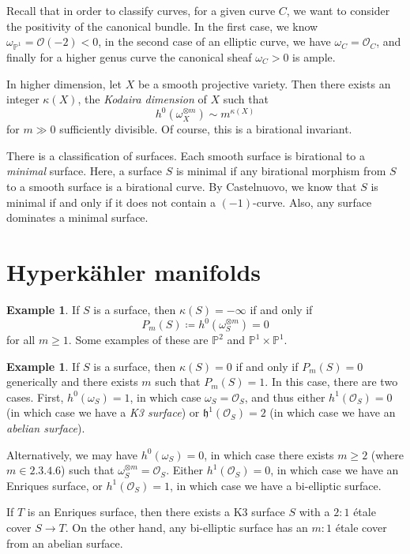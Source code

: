 \documentclass[leqno, openany]{memoir}
\theoremstyle{definition}
\newtheorem{exm}[thm]{Example}
\theoremstyle{remark}
\theoremstyle{plain}
\theoremstyle{definition}
\theoremstyle{remark}
\renewcommand{\P}{\mathbb{P}}
\newcommand{\h}{\mathfrak{h}}
\newcommand{\mc}[1]{\mathcal{#1}}
\begin{document}
Recall that in order to classify curves, for a given curve $C$, we want to consider the positivity of the canonical bundle. In the first case, we know $\omega_{\P^1} = \mc{O}(-2) < 0$, in the second case of an elliptic curve, we have $\omega_C = \mc{O}_C$, and finally for a higher genus curve the canonical sheaf $\omega_C > 0$ is ample.

In higher dimension, let $X$ be a smooth projective variety. Then there exists an integer $\kappa(X)$, the \textit{Kodaira dimension} of $X$ such that
\[ h^0(\omega_X^{\otimes m}) \sim m^{\kappa(X)} \]
for $m \gg 0$ sufficiently divisible. Of course, this is a birational invariant.

There is a classification of surfaces. Each smooth surface is birational to a \textit{minimal} surface. Here, a surface $S$ is minimal if any birational morphism from $S$ to a smooth surface is a birational curve. By Castelnuovo, we know that $S$ is minimal if and only if it does not contain a $(-1)$-curve. Also, any surface dominates a minimal surface.

\section{Hyperk\"ahler manifolds}%
\label{sec:hyperkahler_manifolds}

\begin{exm}
    If $S$ is a surface, then $\kappa(S) = -\infty$ if and only if 
    \[ P_m(S) \coloneqq h^0(\omega_S^{\otimes m}) = 0 \] 
    for all $m \geq 1$. Some examples of these are $\P^2$ and $\P^1 \times \P^1$.
\end{exm}

\begin{exm}
    If $S$ is a surface, then $\kappa(S) = 0$ if and only if $P_m(S) = 0$ generically and there exists $m$ such that $P_m(S) = 1$. In this case, there are two cases. First, $h^0(\omega_S) = 1$, in which case $\omega_S = \mc{O}_S$, and thus either $h^1(\mc{O}_S) = 0$ (in which case we have a \textit{K3 surface}) or $\h^1(\mc{O}_S) = 2$ (in which case we have an \textit{abelian surface}).

    Alternatively, we may have $h^0(\omega_S) = 0$, in which case there exists $m \geq 2$ (where $m \in \qty{2,3,4,6}$) such that $\omega_S^{\otimes m} = \mc{O}_S$. Either $h^1(\mc{O}_S) = 0$, in which case we have an Enriques surface, or $h^1(\mc{O}_S) = 1$, in which case we have a bi-elliptic surface.

    If $T$ is an Enriques surface, then there exists a K3 surface $S$ with a $2:1$ \'etale cover $S \to T$. On the other hand, any bi-elliptic surface has an $m:1$ \'etale cover from an abelian surface.
\end{exm}
\end{document}
